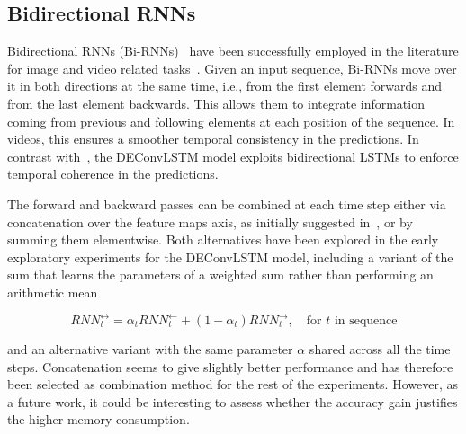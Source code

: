 \subsection{Bidirectional RNNs}\label{deconvLSTM_biRNN}
Bidirectional RNNs (Bi-RNNs)~\citep{Schuster1997bidirecrnn} have been
successfully employed in the literature for image and video related
tasks~\citep{Graves+Schmidhuber-2009,visin2015renet,Du2015_CVPR,
Visin_2016_CVPR_Workshops}. Given an input sequence, Bi-RNNs move over it in
both directions at the same time, i.e., from the first element forwards and
from the last element backwards. This allows them to integrate information
coming from previous and following elements at each position of the sequence.
In videos, this ensures a smoother temporal consistency in the predictions. In
contrast with~\cite{ShiCWYWW15}, the DEConvLSTM model exploits bidirectional
LSTMs to enforce temporal coherence in the predictions.

The forward and backward passes can be combined at each time step either via
concatenation over the feature maps axis, as initially suggested in~\cite{
Schuster1997bidirecrnn}, or by summing them elementwise. Both alternatives have
been explored in the early exploratory experiments for the DEConvLSTM model,
including a variant of the sum that learns the parameters of a weighted sum
rather than performing an arithmetic mean

\begin{equation}
    RNN_t^{\leftrightarrow} = \alpha_t RNN_t^{\leftarrow} +
        (1 - \alpha_t) RNN_t^{\rightarrow}, \quad\text{for $t$ in sequence}
\end{equation}

\noindent and an alternative variant with the same parameter $\alpha$ shared
across all the time steps. Concatenation seems to give slightly better
performance and has therefore been selected as combination method for the
rest of the experiments. However, as a future work, it could be interesting to
assess whether the accuracy gain justifies the higher memory consumption.


